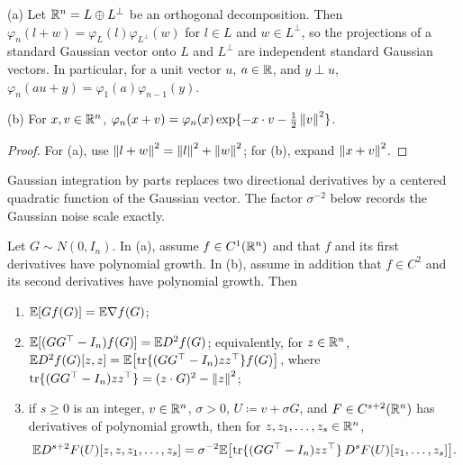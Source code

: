 \begin{fact}\label{tb:gauss-coord}
(a) Let \(\mathbb R^n=L\oplus L^\perp\) be an orthogonal decomposition. Then
\(\varphi_n(l+w)=\varphi_L(l)\varphi_{L^\perp}(w)\) for \(l\in L\) and
\(w\in L^\perp\), so the projections of a standard Gaussian vector onto
\(L\) and \(L^\perp\) are independent standard Gaussian vectors. In
particular, for a unit vector \(u\), \(a\in\mathbb R\), and \(y\perp u\),
\(\varphi_n(au+y)=\varphi_1(a)\varphi_{n-1}(y)\).

(b) For \(x,v\in\mathbb R^n\),
\(\varphi_n(x+v)=\varphi_n(x)\exp\{-x\cdot v-\tfrac12\left\lVert v\right\rVert^2\}\).
\end{fact}

\begin{proof}
For (a), use \(\left\lVert l+w\right\rVert^2=\left\lVert l\right\rVert^2+\left\lVert w\right\rVert^2\); for (b), expand
\(\left\lVert x+v\right\rVert^2\).
\end{proof}


Gaussian integration by parts replaces two directional derivatives by
a centered quadratic function of the Gaussian vector. The factor
\(\sigma^{-2}\) below records the Gaussian noise scale exactly.

\begin{fact}\label{tb:stein}
Let \(G\sim N(0,I_n)\). In (a), assume \(f\in C^1(\mathbb R^n)\) and
that \(f\) and its first derivatives have polynomial growth.
In (b), assume in addition that \(f\in C^2\) and its second
derivatives have polynomial growth. Then
\begin{enumerate}
\item[(a)] \(\mathbb E[Gf(G)]=\mathbb E\nabla f(G)\);
\item[(b)] \(\mathbb E[(GG^\top-I_n)f(G)]=\mathbb E D^2f(G)\); equivalently, for \(z\in\mathbb R^n\),
\(\mathbb E D^2f(G)[z,z]=\mathbb E\bigl[\operatorname{tr}\{(GG^\top-I_n)zz^\top\}f(G)\bigr]\), where
\(\operatorname{tr}\{(GG^\top-I_n)zz^\top\}=(z\cdot G)^2-\left\lVert z\right\rVert^2\);
\item[(c)] if \(s\ge0\) is an integer, \(v\in\mathbb R^n\), \(\sigma>0\),
\(U\coloneqq v+\sigma G\), and
\(F\in C^{s+2}(\mathbb R^n)\) has derivatives of polynomial growth, then for
\(z,z_1,\ldots,z_s\in\mathbb R^n\),
\[
 \mathbb E D^{s+2}F(U)[z,z,z_1,\ldots,z_s]
 =\sigma^{-2}\mathbb E\bigl[\operatorname{tr}\{(GG^\top-I_n)zz^\top\}\,
 D^sF(U)[z_1,\ldots,z_s]\bigr].
\]
\end{enumerate}
\end{fact}

